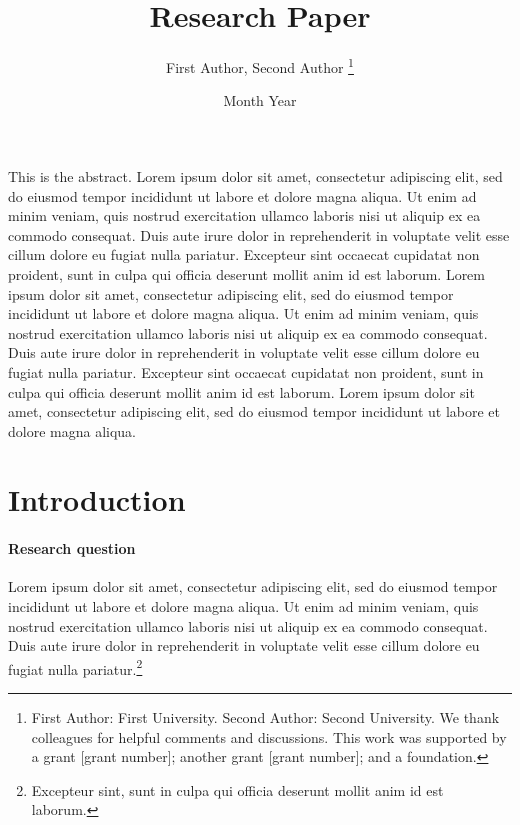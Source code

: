 \documentclass[letterpaper,11pt,leqno]{article}
\begin{document}
\title{Research Paper}

\author{First Author, Second Author
%
\thanks{First Author: First University. Second Author: Second University. We thank colleagues for helpful comments and discussions. This work was supported by a grant [grant number]; another grant [grant number]; and a foundation.}}

\date{Month Year}   


\begin{titlepage}
\maketitle

This is the abstract. Lorem ipsum dolor sit amet, consectetur adipiscing elit, sed do eiusmod tempor incididunt ut labore et dolore magna aliqua. Ut enim ad minim veniam, quis nostrud exercitation ullamco laboris nisi ut aliquip ex ea commodo consequat. Duis aute irure dolor in reprehenderit in voluptate velit esse cillum dolore eu fugiat nulla pariatur. Excepteur sint occaecat cupidatat non proident, sunt in culpa qui officia deserunt mollit anim id est laborum. Lorem ipsum dolor sit amet, consectetur adipiscing elit, sed do eiusmod tempor incididunt ut labore et dolore magna aliqua. Ut enim ad minim veniam, quis nostrud exercitation ullamco laboris nisi ut aliquip ex ea commodo consequat. Duis aute irure dolor in reprehenderit in voluptate velit esse cillum dolore eu fugiat nulla pariatur. Excepteur sint occaecat cupidatat non proident, sunt in culpa qui officia deserunt mollit anim id est laborum. Lorem ipsum dolor sit amet, consectetur adipiscing elit, sed do eiusmod tempor incididunt ut labore et dolore magna aliqua.

\end{titlepage}

\section{Introduction}\label{s:introduction}
 
\paragraph{Research question} Lorem ipsum dolor sit amet, consectetur adipiscing elit, sed do eiusmod tempor incididunt ut labore et dolore magna aliqua. Ut enim ad minim veniam, quis nostrud exercitation ullamco laboris nisi ut aliquip ex ea commodo consequat. Duis aute irure dolor in reprehenderit in voluptate velit esse cillum dolore eu fugiat nulla pariatur.\footnote{Excepteur sint, sunt in culpa qui officia deserunt mollit anim id est laborum.}
\end{document}
